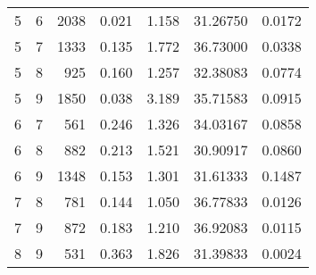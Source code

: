 \begin{longtable}{rrrrrrr}
5 & 6 & 2038 & 0.021 & 1.158 & 31.26750 & 0.0172 \\ 
5 & 7 & 1333 & 0.135 & 1.772 & 36.73000 & 0.0338 \\ 
5 & 8 & 925 & 0.160 & 1.257 & 32.38083 & 0.0774 \\ 
5 & 9 & 1850 & 0.038 & 3.189 & 35.71583 & 0.0915 \\ 
6 & 7 & 561 & 0.246 & 1.326 & 34.03167 & 0.0858 \\ 
6 & 8 & 882 & 0.213 & 1.521 & 30.90917 & 0.0860 \\ 
6 & 9 & 1348 & 0.153 & 1.301 & 31.61333 & 0.1487 \\ 
7 & 8 & 781 & 0.144 & 1.050 & 36.77833 & 0.0126 \\ 
7 & 9 & 872 & 0.183 & 1.210 & 36.92083 & 0.0115 \\ 
8 & 9 & 531 & 0.363 & 1.826 & 31.39833 & 0.0024 \\ 
\bottomrule
\end{longtable}

